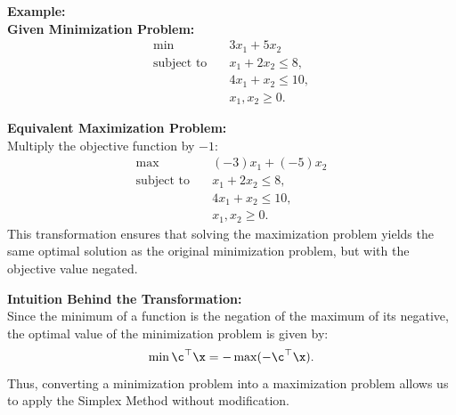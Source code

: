 \textbf{Example:} \\

\textbf{Given Minimization Problem:}
\[
\begin{aligned}
    \min \quad & 3x_1 + 5x_2 \\
    \text{subject to} \quad 
    & x_1 + 2x_2 \leq 8, \\
    & 4x_1 + x_2 \leq 10, \\
    & x_1, x_2 \geq 0.
\end{aligned}
\]

\textbf{Equivalent Maximization Problem:} \\
Multiply the objective function by \(-1\):
\[
\begin{aligned}
    \max \quad & (-3)x_1 + (-5)x_2 \\
    \text{subject to} \quad 
    & x_1 + 2x_2 \leq 8, \\
    & 4x_1 + x_2 \leq 10, \\
    & x_1, x_2 \geq 0.
\end{aligned}
\]
This transformation ensures that solving the maximization problem yields the same optimal solution as the original minimization problem, but with the objective value negated.

\textbf{Intuition Behind the Transformation:} \\
Since the minimum of a function is the negation of the maximum of its negative, the optimal value of the minimization problem is given by:
\[
\min \c^\top \x = - \max (-\c^\top \x).
\]
Thus, converting a minimization problem into a maximization problem allows us to apply the Simplex Method without modification.



